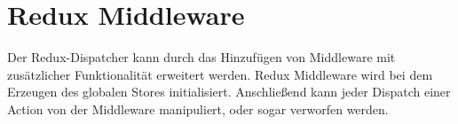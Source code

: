 \section{Redux Middleware}
\label{sec:f_redux_middleware}

Der Redux-Dispatcher kann durch das Hinzufügen von Middleware mit zusätzlicher
Funktionalität erweitert werden.  Redux Middleware wird bei dem Erzeugen des
globalen Stores initialisiert.  Anschließend kann jeder Dispatch einer Action
von der Middleware manipuliert, oder sogar verworfen werden.




